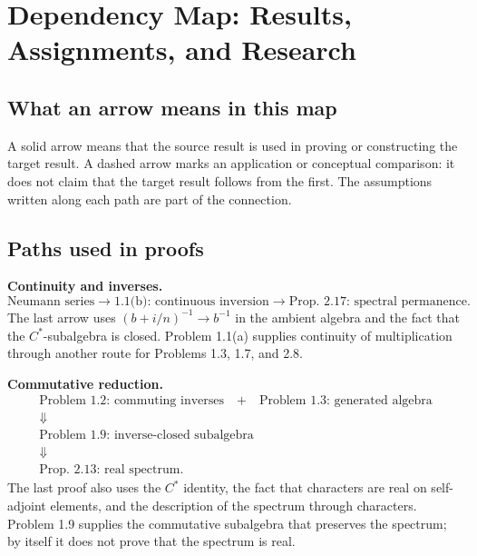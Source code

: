 \chapter{Dependency Map: Results, Assignments, and Research}

\section{What an arrow means in this map}

\begin{context}
A solid arrow means that the source result is used in proving or constructing the target
result. A dashed arrow marks an application or conceptual comparison: it does not claim
that the target result follows from the first. The assumptions written along each path are
part of the connection.
\end{context}

\section{Paths used in proofs}

\begin{dependencias}
\textbf{Continuity and inverses.}
\[
\boxed{\text{Neumann series}}
\longrightarrow
\boxed{\text{1.1(b): continuous inversion}}
\longrightarrow
\boxed{\text{Prop. 2.17: spectral permanence}}.
\]
The last arrow uses $(b+i/n)^{-1}\to b^{-1}$ in the ambient algebra and the fact that the
$C^*$-subalgebra is closed. Problem 1.1(a) supplies continuity of multiplication through
another route for Problems 1.3, 1.7, and 2.8.
\end{dependencias}

\begin{dependencias}
\textbf{Commutative reduction.}
\[
\begin{gathered}
\boxed{\text{Problem 1.2: commuting inverses}}
\quad+\quad
\boxed{\text{Problem 1.3: generated algebra}}\\[2mm]
\Downarrow\\[2mm]
\boxed{\text{Problem 1.9: inverse-closed subalgebra}}\\[2mm]
\Downarrow\\[2mm]
\boxed{\text{Prop. 2.13: real spectrum}}.
\end{gathered}
\]
The last proof also uses the $C^*$ identity, the fact that characters are real on
self-adjoint elements, and the description of the spectrum through characters.
Problem 1.9 supplies the commutative subalgebra that preserves the spectrum;
by itself it does not prove that the spectrum is real.
\end{dependencias}

